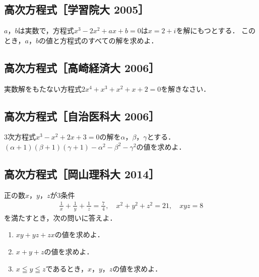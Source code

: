 \documentclass[../../ms_q.tex]{subfiles}
\begin{document}
\vspace{2cm}
\vfill

\subsection{高次方程式［学習院大 2005］}

$a$，$b$は実数で，方程式$x^3-2x^2+ax+b=0$は$x=2+i$を解にもつとする．
このとき，$a$，$b$の値と方程式のすべての解を求めよ．

\vspace{2cm}
\vfill

\subsection{高次方程式［高崎経済大 2006］}

実数解をもたない方程式$2x^4+x^3+x^2+x+2=0$を解きなさい．

\vspace{2cm}
\vfill

\subsection{高次方程式［自治医科大 2006］}

3次方程式$x^3-x^2+2x+3=0$の解を$\alpha$，$\beta$，$\gamma$とする．
$(\alpha+1)(\beta+1)(\gamma+1)-\alpha^2-\beta^2-\gamma^2$の値を求めよ．

\vspace{2cm}
\vfill

\subsection{高次方程式［岡山理科大 2014］}

正の数$x$，$y$，$z$が3条件
\begin{align*}
    \frac{\,1\,}{x}+\frac{\,1\,}{y}+\frac{\,1\,}{z}=\frac{\,7\,}{4}, \quad
    x^2+y^2+z^2=21, \quad xyz=8    
\end{align*}
を満たすとき，次の問いに答えよ．

\begin{enumerate}

    \item $xy+yz+zx$の値を求めよ．

    \item $x+y+z$の値を求めよ．
    
    \item $x\leqq y\leqq z$であるとき，$x$，$y$，$z$の値を求めよ．
    
\end{enumerate}
\end{document}
